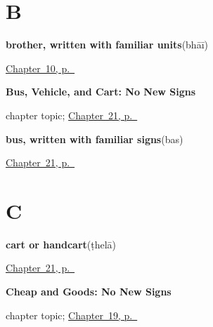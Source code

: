 \section*{B}

\noindent\begin{minipage}[t]{\linewidth}
\raggedright
\textbf{brother, written with familiar units}\enspace\emph{}\enspace(bhāī)\par
\footnotesize \hyperref[ch:mw-family-four]{Chapter~10, p.~\pageref*{ch:mw-family-four}}
\end{minipage}\par\smallskip

\noindent\begin{minipage}[t]{\linewidth}
\raggedright
\textbf{Bus, Vehicle, and Cart: No New Signs}\par
\footnotesize chapter topic; \hyperref[ch:mw-transport-three]{Chapter~21, p.~\pageref*{ch:mw-transport-three}}
\end{minipage}\par\smallskip

\noindent\begin{minipage}[t]{\linewidth}
\raggedright
\textbf{bus, written with familiar signs}\enspace\emph{}\enspace(bas)\par
\footnotesize \hyperref[ch:mw-transport-three]{Chapter~21, p.~\pageref*{ch:mw-transport-three}}
\end{minipage}\par\smallskip

\section*{C}

\noindent\begin{minipage}[t]{\linewidth}
\raggedright
\textbf{cart or handcart}\enspace\emph{}\enspace(ṭhelā)\par
\footnotesize \hyperref[ch:mw-transport-three]{Chapter~21, p.~\pageref*{ch:mw-transport-three}}
\end{minipage}\par\smallskip

\noindent\begin{minipage}[t]{\linewidth}
\raggedright
\textbf{Cheap and Goods: No New Signs}\par
\footnotesize chapter topic; \hyperref[ch:mw-shopping-five]{Chapter~19, p.~\pageref*{ch:mw-shopping-five}}
\end{minipage}\par\smallskip

